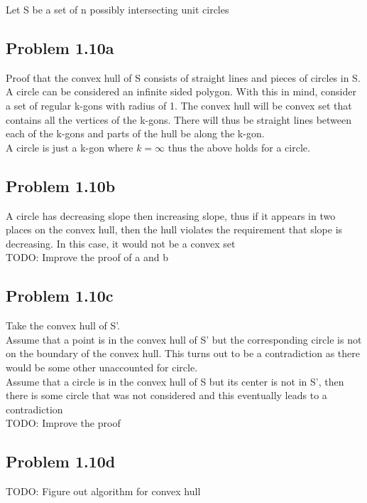 \documentclass[11pt,psfig]{article}
\begin{document}
Let S be a set of n possibly intersecting unit circles

\subsection*{Problem 1.10a}

Proof that the convex hull of S consists of straight lines and pieces of circles in S. 
\\
A circle can be considered an infinite sided polygon. With this in mind, consider a set of regular k-gons with radius of 1. The convex hull will be convex set that contains all the vertices of the k-gons. There will thus be straight lines between each of the k-gons and parts of the hull be along the k-gon. 
\\
A circle is just a k-gon where $k=\infty$ thus the above holds for a circle. 

\subsection*{Problem 1.10b}


A circle has decreasing slope then increasing slope, thus if it appears in two places on the convex hull, then the hull violates the requirement that slope is decreasing. In this case, it would not be a convex set
\\
TODO: Improve the proof of a and b

\subsection*{Problem 1.10c}

Take the convex hull of S'. 
\\
Assume that a point is in the convex hull of S' but the corresponding circle is not on the boundary of the convex hull. This turns out to be a contradiction as there would be some other unaccounted for circle. \\
Assume that a circle is in the convex hull of S but its center is not in S', then there is some circle that was not considered and this eventually leads to a contradiction
\\
TODO: Improve the proof

\subsection*{Problem 1.10d}

TODO: Figure out algorithm for convex hull
\end{document}
